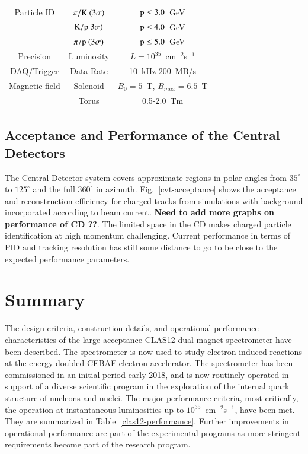 \documentclass[final,3p,times,twocolumn,authoryear]{elsarticle}
\begin{document}
\begin{table}[ht!]
\begin{center}
\begin{tabular}{|c|c|c|}
\hline
Particle ID& $\pi/\rm K ~(3\sigma)$ & $\rm p \le 3.0$~GeV  \\
& $\rm K/p ~ 3\sigma)$  & $\rm p \le 4.0$~GeV \\
& $\pi / \rm p~ (3\sigma)$  & $\rm p \le 5.0$~GeV \\
\hline
Precision & Luminosity &  $L = 10^{35}$~cm$^{-2}$s$^{-1}$ \\
\hline
DAQ/Trigger &  Data Rate &  10~kHz  200~MB/s \\
\hline 
Magnetic field & Solenoid& $B_0=5$~T, $B_{max}=6.5$~T\\
& Torus & 0.5-2.0~Tm\\
\hline 
\end{tabular}
\end{center}
\end{table}

\subsection{Acceptance and Performance of the Central Detectors} 

The Central Detector system covers approximate regions in polar angles from $35^\circ$ to $125^\circ$ and the full
$360^\circ$ in azimuth.  Fig.~\ref{cvt-acceptance} shows the acceptance and reconstruction efficiency for charged tracks
from simulations with background incorporated according to beam current. {\bf Need to add more graphs on performance
of CD ??}. The limited space in the CD makes charged particle identification at high momentum challenging. Current performance
in terms of PID and tracking resolution has still some distance to go to be close to the expected performance parameters.   

\section{Summary} 

The design criteria, construction details, and operational performance characteristics of the large-acceptance CLAS12 dual 
magnet spectrometer have been described. The spectrometer is now used to study electron-induced reactions at the
energy-doubled CEBAF electron accelerator. The spectrometer has been commissioned in an initial period early 2018, and is
now routinely operated in support of a diverse scientific program in the exploration of the internal quark structure of nucleons
and nuclei. The major performance criteria, most critically, the operation at  instantaneous luminosities up to 
$10^{35}$~cm$^{-2}$s$^{-1}$, have been met. They are summarized in Table~\ref{clas12-performance}. Further improvements 
in operational performance are part of the experimental programs as more stringent requirements become part of the 
research program.  
\end{document}
